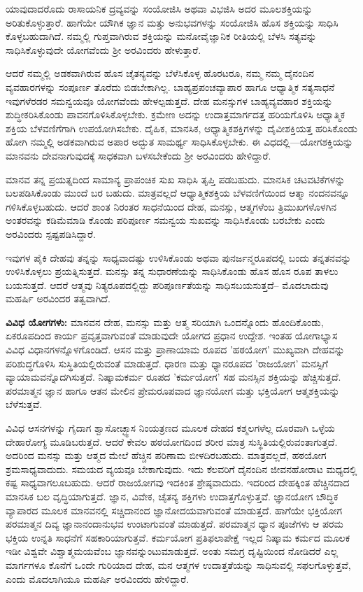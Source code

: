 ಯಾವುದಾದರೊದು ರಾಸಾಯನಿಕ ದ್ರವ್ಯವನ್ನು ಸಂಯೋಜಿಸಿ ಅಥವಾ ವಿಭಜಿಸಿ ಅದರ ಮೂಲಶಕ್ತಿಯನ್ನು ಅರಿತುಕೊಳ್ಳುತ್ತಾರೆ. ಹಾಗೆಯೇ ಯೌಗಿಕ ಜ್ಞಾನ ಮತ್ತು ಅನುಭವಗಳನ್ನು ಸಂಯೋಜಿಸಿ ಹೊಸ ಶಕ್ತಿಯನ್ನು ಸಾಧಿಸಿ ಕೊಳ್ಳಬಹುದಾಗಿದೆ. ನಮ್ಮಲ್ಲಿ ಗುಪ್ತವಾಗಿರುವ ಶಕ್ತಿಯನ್ನು ಮನೋವೈಜ್ಞಾನಿಕ ರೀತಿಯಲ್ಲಿ ಬೆಳಸಿ ಸತ್ಯವನ್ನು ಸಾಧಿಸಿಕೊಳ್ಳುವುದೇ ಯೋಗವೆಂದು ಶ‍್ರೀ ಅರವಿಂದರು ಹೇಳುತ್ತಾರೆ.

ಆದರೆ ನಮ್ಮಲ್ಲಿ ಅಡಕವಾಗಿರುವ ಹೊಸ ಚೈತನ್ಯವನ್ನು ಬೆಳೆಸಿಕೊಳ್ಳ ಹೊರಟರೂ, ನಮ್ಮ ನಮ್ಮ ದೈನಂದಿನ ವ್ಯವಹಾರಗಳನ್ನು ಸಂಪೂರ್ಣ ತೊರೆದು ಬಿಡಬೇಕಾಗಿಲ್ಲ. ಬಾಹ್ಯಪ್ರಪಂಚವ್ಯಾಪಾರ ಹಾಗೂ ಆಧ್ಯಾತ್ಮಿಕ ಸತ್ಯಸಾಧನೆ ಇವುಗಳೆರಡರ ಸಮನ್ವಯವೂ ಯೋಗವೆಂದು ಹೇಳಲ್ಪಡುತ್ತದೆ. ದೇಹ ಮನಸ್ಸುಗಳ ಬಾಹ್ಯವ್ಯವಹಾರ ಶಕ್ತಿಯನ್ನು ಶುದ್ಧೀಕರಿಸಿಕೊಂಡು ಪಾವನಗೊಳಿಸಿಕೊಳ್ಳಬೇಕು. ಕ್ರಮೇಣ ಅದನ್ನು ಉದಾತ್ತಮಾರ್ಗದತ್ತ ಹರಿಯಗೊಳಿಸಿ ಆಧ್ಯಾತ್ಮಿಕ ಶಕ್ತಿಯ ಬೆಳವಣಿಗೆಗಾಗಿ ಉಪಯೋಗಿಸಬೇಕು. ದೈಹಿಕ, ಮಾನಸಿಕ, ಆಧ್ಯಾತ್ಮಿಕಶಕ್ತಿಗಳನ್ನು ದೈವೀಶಕ್ತಿಯತ್ತ ಹರಿಸಿಕೊಂಡು ಹೋಗಿ ನಮ್ಮಲ್ಲಿ ಅಡಕವಾಗಿರುವ ಅಪಾರ ಅದ್ಭುತ ಸಾಮರ್ಥ್ಯ ಸಾಧಿಸಿಕೊಳ್ಳಬೇಕು. ಈ ವಿಧದಲ್ಲಿ—ಯೋಗಶಕ್ತಿಯನ್ನು ಮಾನವನು ದೇವನಾಗುವುದಕ್ಕೆ ಸಾಧಕವಾಗಿ ಬಳಸಬೇಕೆಂದು ಶ‍್ರೀ ಅರವಿಂದರು ಹೇಳಿದ್ದಾರೆ.

ಮಾನವ ತನ್ನ ಪ್ರಯತ್ನದಿಂದ ಸಾಮಾನ್ಯ ಪ್ರಾಪಂಚಿಕ ಸುಖ ಸಾಧಿಸಿ ತೃಪ್ತಿ ಪಡಬಹುದು. ಮಾನಸಿಕ ಚಟವಟಿಕೆಗಳನ್ನು ಬಲಪಡಿಸಿಕೊಂಡು ಮುಂದೆ ಬರ ಬಹುದು. ಮಾತ್ರವಲ್ಲದೆ ಆಧ್ಯಾತ್ಮಿಕಶಕ್ತಿಯ ಬೆಳವಣಿಗೆಯಿಂದ ಆತ್ಮಾ ನಂದನವನ್ನೂ ಗಳಿಸಿಕೊಳ್ಳಬಹುದು. ಆದರೆ ಶಾಂತ ನಿರಂತರ ಸಾಧನೆಯಿಂದ ದೇಹ, ಮನಸ್ಸು, ಆತ್ಮಗಳೆಂಬ ತ್ರಿಮುಖಗಳೊಳಗಿನ ಅಂತರವನ್ನು ಕಡಿಮೆಮಾಡಿ ಕೊಂಡು ಪರಿಪೂರ್ಣ ಸಮನ್ವಯ ಸುಖವನ್ನು ಸಾಧಿಸಿಕೊಂಡು ಬರಬೇಕು ಎಂದು ಅರವಿಂದರು ಸ್ಪಷ್ಟಪಡಿಸಿದ್ದಾರೆ.

ಇವುಗಳ ಪೈಕಿ ದೇಹವು ತನ್ನನ್ನು ಸಾಧ್ಯವಾದಷ್ಟು ಉಳಿಸಿಕೊಂಡು ಅಥವಾ ಪುನರ್ಜನ್ಮರೂಪದಲ್ಲಿ ಬಂದು ತನ್ನತನವನ್ನು ಉಳಿಸಿಕೊಳ್ಳಲು ಪ್ರಯತ್ನಿಸುತ್ತದೆ. ಮನಸ್ಸು ತನ್ನ ಸುಧಾರಣೆಯನ್ನು ಸಾಧಿಸಿಕೊಂಡು ಹೊಸ ಹೊಸ ರೂಪ ತಾಳಲು ಬಯಸುತ್ತದೆ. ಆದರೆ ಆತ್ಮವು ನಿತ್ಯರೂಪದಲ್ಲಿದ್ದು ಪರಿಪೂರ್ಣತೆಯನ್ನು ಸಾಧಿಸಬಯಸುತ್ತದೆ– ಮೊದಲಾದುವು ಮಹರ್ಷಿ ಅರವಿಂದರ ತತ್ವವಾಗಿದೆ.

\textbf{ವಿವಿಧ ಯೋಗಗಳು:} ಮಾನವನ ದೇಹ, ಮನಸ್ಸು ಮತ್ತು ಆತ್ಮ ಸರಿಯಾಗಿ ಒಂದನ್ನೊಂದು ಹೊಂದಿಕೊಂಡು, ಏಕರೂಪದಿಂದ ಕಾರ್ಯ ಪ್ರವೃತ್ತವಾಗುವಂತೆ ಮಾಡುವುದೇ ಯೋಗದ ಪ್ರಧಾನ ಉದ್ದೇಶ. ಇಂತಹ ಯೋಗಾಭ್ಯಾಸ ವಿವಿಧ ವಿಧಾನಗಳನ್ನೊಳಗೊಂಡಿದೆ. ಆಸನ ಮತ್ತು ಪ್ರಾಣಾಯಾಮ ರೂಪದ 'ಹಠಯೋಗ' ಮುಖ್ಯವಾಗಿ ದೇಹವನ್ನು ಪರಿಶುದ್ಧಗೊಳಿಸಿ ಸುಸ್ಥಿತಿಯಲ್ಲಿರುವಂತೆ ಮಾಡುತ್ತದೆ. ಧಾರಣ ಮತ್ತು ಧ್ಯಾನರೂಪದ 'ರಾಜಯೋಗ' ಮನಸ್ಸಿಗೆ ವ್ಯಾಯಾಮವನ್ನೊದಗಿಸುತ್ತದೆ. ನಿಷ್ಕಾಮಕರ್ಮ ರೂಪದ 'ಕರ್ಮಯೋಗ' ಸಹ ಮನಸ್ಸಿನ ಶಕ್ತಿಯನ್ನು ಹೆಚ್ಚಿಸುತ್ತದೆ. ಪರಮಾತ್ಮನ ಜ್ಞಾನ ಹಾಗೂ ಆತನ ಮೇಲಿನ ಪ್ರೇಮರೂಪವಾದ ಜ್ಞಾನಯೋಗ ಮತ್ತು ಭಕ್ತಿಯೋಗ ಆತ್ಮಶಕ್ತಿಯನ್ನು ಬೆಳೆಸುತ್ತವೆ.

ವಿವಿಧ ಆಸನಗಳನ್ನು ಗೈದಾಗ ಶ್ವಾಸೋಚ್ಛ್ವಾಸ ನಿಂಯತ್ರಣದ ಮೂಲಕ ದೇಹದ ಕಶ್ಮಲಗಳೆಲ್ಲ ದೂರವಾಗಿ ಒಳ್ಳೆಯ ದೇಹಾರೋಗ್ಯ ಮೂಡಿಬರುತ್ತದೆ. ಆದರೆ ಕೇವಲ ಹಠಯೋಗದಿಂದ ಶರೀರ ಮಾತ್ರ ಸುಸ್ಥಿತಿಯಲ್ಲಿರುವಂತಾಗುತ್ತದೆ. ಅದರಿಂದ ಮನಸ್ಸು ಮತ್ತು ಆತ್ಮದ ಮೇಲೆ ಹೆಚ್ಚಿನ ಪರಿಣಾಮ ಬೀಳದಿರಬಹುದು. ಮಾತ್ರವಲ್ಲದೆ, ಹಠಯೋಗ ಶ್ರಮಸಾಧ್ಯವಾದುದು. ಸಮಯದ ವ್ಯಯವೂ ಬೇಕಾಗುವುದು. ಇದು ಕೆಲವರಿಗೆ ದೈನಂದಿನ ಜೀವನಹೋರಾಟ ಮಧ್ಯದಲ್ಲಿ ಕಷ್ಟ ಸಾಧ್ಯವಾಗಲೂಬಹುದು. ಆದರೆ ರಾಜಯೋಗವು ಇದಕಿಂತ ಶ್ರೇಷ್ಠವಾದುದು. ಇದರಿಂದ ದೇಹಕ್ಕಿಂತ ಹೆಚ್ಚಿನದಾದ ಮಾನಸಿಕ ಬಲ ವೃದ್ಧಿಯಾಗುತ್ತದೆ. ಜ್ಞಾನ, ವಿವೇಕ, ಚೈತನ್ಯ ಶಕ್ತಿಗಳು ಉದಾತ್ತಗೊಳ್ಳುತ್ತವೆ. ಜ್ಞಾನಯೋಗ ಬೌದ್ಧಿಕ ವ್ಯಾಪಾರದ ಮೂಲಕ ಮಾನವನಲ್ಲಿ ಸಚ್ಚಿದಾನಂದ ಜ್ಞಾನೋದಯವಾಗುವಂತೆ ಮಾಡುತ್ತದೆ. ಹಾಗೆಯೇ ಭಕ್ತಿಯೋಗ ಪರಮಾತ್ಮನ ದಿವ್ಯ ಜ್ಞಾನಾನಂದಾನುಭವ ಉಂಟಾಗುವಂತೆ ಮಾಡುತ್ತದೆ. ಪರಮಾತ್ಮನ ಧ್ಯಾನ ಪೂಜೆಗಳು ಆ ಪರಮ ಭಕ್ತಿಯ ಉನ್ನತಿ ಸಾಧನೆಗೆ ಸಹಕಾರಿಯಾಗುತ್ತವೆ. ಕರ್ಮಯೋಗ ಪ್ರತಿಫಲಾಪೇಕ್ಷೆ ಇಲ್ಲದ ನಿಷ್ಕಾಮ ಕರ್ಮದ ಮೂಲಕ ಇಡೀ ವಿಶ್ವವೇ ವಿಶ್ವಾತ್ಮಮಯವೆಂಬ ಜ್ಞಾನವನ್ನುಂಟುಮಾಡುತ್ತದೆ. ಅಂತು ಸಮಗ್ರ ದೃಷ್ಟಿಯಿಂದ ನೋಡಿದರೆ ಎಲ್ಲ ಮಾರ್ಗಗಳೂ ಕೊನೆಗೆ ಒಂದೇ ಗುರಿಯಾದ ದೇಹ, ಮನ ಆತ್ಮಗಳ ಉದಾತ್ತತೆಯನ್ನು ಸಾಧಿಸುವಲ್ಲಿ ಸಫಲಗೊಳ್ಳುತ್ತವೆ, ಎಂದು ಮೊದಲಾಗಿಯೂ ಮಹರ್ಷಿ ಅರವಿಂದರು ಹೇಳಿದ್ದಾರೆ.

